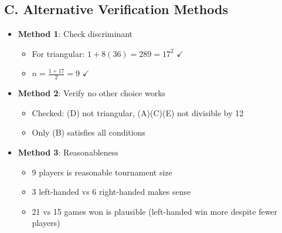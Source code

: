 \documentclass[12pt]{article}
\begin{document}
\begin{verificationbox}
\subsection*{C. Alternative Verification Methods}
\begin{itemize}[leftmargin=*]
    \item \textbf{Method 1}: Check discriminant
    \begin{itemize}
        \item For triangular: $1 + 8(36) = 289 = 17^2$ $\checkmark$
        \item $n = \frac{1+17}{2} = 9$ $\checkmark$
    \end{itemize}
    \item \textbf{Method 2}: Verify no other choice works
    \begin{itemize}
        \item Checked: (D) not triangular, (A)(C)(E) not divisible by 12
        \item Only (B) satisfies all conditions
    \end{itemize}
    \item \textbf{Method 3}: Reasonableness
    \begin{itemize}
        \item 9 players is reasonable tournament size
        \item 3 left-handed vs 6 right-handed makes sense
        \item 21 vs 15 games won is plausible (left-handed win more despite fewer players)
    \end{itemize}
\end{itemize}
\end{verificationbox}
\end{document}
